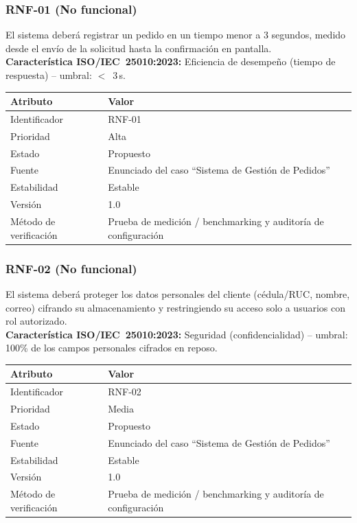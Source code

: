 \documentclass[11pt]{article}
\begin{document}
\subsubsection*{RNF-01 (No funcional)}
El sistema deberá registrar un pedido en un tiempo menor a 3 segundos, medido desde el envío de la
solicitud hasta la confirmación en pantalla.\\
\textbf{Característica ISO/IEC~25010:2023:} Eficiencia de desempeño (tiempo de respuesta) -- umbral:
$<$~3\,s.

\begin{table}[h]
\centering
\begin{tabular}{ll}
\toprule
\textbf{Atributo} & \textbf{Valor} \\
\midrule
Identificador & RNF-01 \\
Prioridad & Alta \\
Estado & Propuesto \\
Fuente & Enunciado del caso ``Sistema de Gestión de Pedidos'' \\
Estabilidad & Estable \\
Versión & 1.0 \\
Método de verificación & Prueba de medición / benchmarking y auditoría de configuración \\
\bottomrule
\end{tabular}
\end{table}

\subsubsection*{RNF-02 (No funcional)}
El sistema deberá proteger los datos personales del cliente (cédula/RUC, nombre, correo) cifrando su
almacenamiento y restringiendo su acceso solo a usuarios con rol autorizado.\\
\textbf{Característica ISO/IEC~25010:2023:} Seguridad (confidencialidad) -- umbral: 100\% de los campos
personales cifrados en reposo.

\begin{table}[h]
\centering
\begin{tabular}{ll}
\toprule
\textbf{Atributo} & \textbf{Valor} \\
\midrule
Identificador & RNF-02 \\
Prioridad & Media \\
Estado & Propuesto \\
Fuente & Enunciado del caso ``Sistema de Gestión de Pedidos'' \\
Estabilidad & Estable \\
Versión & 1.0 \\
Método de verificación & Prueba de medición / benchmarking y auditoría de configuración \\
\bottomrule
\end{tabular}
\end{table}
\end{document}
